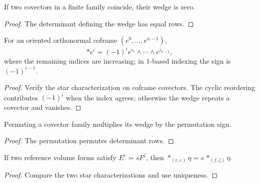 \begin{lemma}
\label{lem:wedge-covectors-repeat-zero}
\leanok
{}
If two covectors in a finite family coincide, their wedge is zero.
\end{lemma}
\begin{proof}
\leanok
\sketch The determinant defining the wedge has equal rows.
\end{proof}

\begin{proposition}
\label{prop:hodge-star-euclidean-single}
\leanok
{}
For an oriented orthonormal coframe $(e^0,\ldots,e^{n-1})$,
\[
{*} e^i=(-1)^i e^{i_1}\wedge\cdots\wedge e^{i_{n-1}},
\]
where the remaining indices are increasing; in $1$-based indexing the sign is $(-1)^{i-1}$.
\end{proposition}
\begin{proof}
\leanok
{}
\sketch Verify the star characterization on coframe covectors. The cyclic reordering contributes $(-1)^i$ when the index agrees; otherwise the wedge repeats a covector and vanishes.
\end{proof}

\begin{lemma}
\label{lem:wedge-covectors-sign}
\leanok
{}
Permuting a covector family multiplies its wedge by the permutation sign.
\end{lemma}
\begin{proof}
\leanok
\sketch The permutation permutes determinant rows.
\end{proof}

\begin{lemma}
\label{lem:hodge-star-congr-smul}
\leanok
{}
If two reference volume forms satisfy $E^\varepsilon=sF^\zeta$, then $*_{(e,\varepsilon)}\eta=s\,*_{(f,\zeta)}\eta$.
\end{lemma}
\begin{proof}
\leanok
\sketch Compare the two star characterizations and use uniqueness.
\end{proof}

